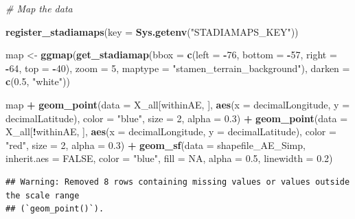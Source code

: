 \documentclass[sn-apa,pdflatex]{sn-jnl}
\newenvironment{Shaded}{\begin{snugshade}}{\end{snugshade}}
\newcommand{\AttributeTok}[1]{\textcolor[rgb]{0.13,0.29,0.53}{#1}}
\newcommand{\CommentTok}[1]{\textcolor[rgb]{0.56,0.35,0.01}{\textit{#1}}}
\newcommand{\ConstantTok}[1]{\textcolor[rgb]{0.56,0.35,0.01}{#1}}
\newcommand{\DecValTok}[1]{\textcolor[rgb]{0.00,0.00,0.81}{#1}}
\newcommand{\FloatTok}[1]{\textcolor[rgb]{0.00,0.00,0.81}{#1}}
\newcommand{\FunctionTok}[1]{\textcolor[rgb]{0.13,0.29,0.53}{\textbf{#1}}}
\newcommand{\NormalTok}[1]{#1}
\newcommand{\OtherTok}[1]{\textcolor[rgb]{0.56,0.35,0.01}{#1}}
\newcommand{\SpecialCharTok}[1]{\textcolor[rgb]{0.81,0.36,0.00}{\textbf{#1}}}
\newcommand{\StringTok}[1]{\textcolor[rgb]{0.31,0.60,0.02}{#1}}
\begin{document}
\begin{Shaded}
\begin{Highlighting}[]
\CommentTok{\# Map the data}

\FunctionTok{register\_stadiamaps}\NormalTok{(}\AttributeTok{key =} \FunctionTok{Sys.getenv}\NormalTok{(}\StringTok{"STADIAMAPS\_KEY"}\NormalTok{))}

\NormalTok{map }\OtherTok{\textless{}{-}} \FunctionTok{ggmap}\NormalTok{(}\FunctionTok{get\_stadiamap}\NormalTok{(}\AttributeTok{bbox =} \FunctionTok{c}\NormalTok{(}\AttributeTok{left =} \SpecialCharTok{{-}}\DecValTok{76}\NormalTok{, }\AttributeTok{bottom =} \SpecialCharTok{{-}}\DecValTok{57}\NormalTok{,}
    \AttributeTok{right =} \SpecialCharTok{{-}}\DecValTok{64}\NormalTok{, }\AttributeTok{top =} \SpecialCharTok{{-}}\DecValTok{40}\NormalTok{), }\AttributeTok{zoom =} \DecValTok{5}\NormalTok{, }\AttributeTok{maptype =} \StringTok{"stamen\_terrain\_background"}\NormalTok{),}
    \AttributeTok{darken =} \FunctionTok{c}\NormalTok{(}\FloatTok{0.5}\NormalTok{, }\StringTok{"white"}\NormalTok{))}

\NormalTok{map }\SpecialCharTok{+} \FunctionTok{geom\_point}\NormalTok{(}\AttributeTok{data =}\NormalTok{ X\_all[withinAE, ], }\FunctionTok{aes}\NormalTok{(}\AttributeTok{x =}\NormalTok{ decimalLongitude,}
    \AttributeTok{y =}\NormalTok{ decimalLatitude), }\AttributeTok{color =} \StringTok{"blue"}\NormalTok{, }\AttributeTok{size =} \DecValTok{2}\NormalTok{, }\AttributeTok{alpha =} \FloatTok{0.3}\NormalTok{) }\SpecialCharTok{+}
    \FunctionTok{geom\_point}\NormalTok{(}\AttributeTok{data =}\NormalTok{ X\_all[}\SpecialCharTok{!}\NormalTok{withinAE, ], }\FunctionTok{aes}\NormalTok{(}\AttributeTok{x =}\NormalTok{ decimalLongitude,}
        \AttributeTok{y =}\NormalTok{ decimalLatitude), }\AttributeTok{color =} \StringTok{"red"}\NormalTok{, }\AttributeTok{size =} \DecValTok{2}\NormalTok{, }\AttributeTok{alpha =} \FloatTok{0.3}\NormalTok{) }\SpecialCharTok{+}
    \FunctionTok{geom\_sf}\NormalTok{(}\AttributeTok{data =}\NormalTok{ shapefile\_AE\_Simp, }\AttributeTok{inherit.aes =} \ConstantTok{FALSE}\NormalTok{, }\AttributeTok{color =} \StringTok{"blue"}\NormalTok{,}
        \AttributeTok{fill =} \ConstantTok{NA}\NormalTok{, }\AttributeTok{alpha =} \FloatTok{0.5}\NormalTok{, }\AttributeTok{linewidth =} \FloatTok{0.2}\NormalTok{)}
\end{Highlighting}
\end{Shaded}

\begin{verbatim}
## Warning: Removed 8 rows containing missing values or values outside the scale range
## (`geom_point()`).
\end{verbatim}
\end{document}

